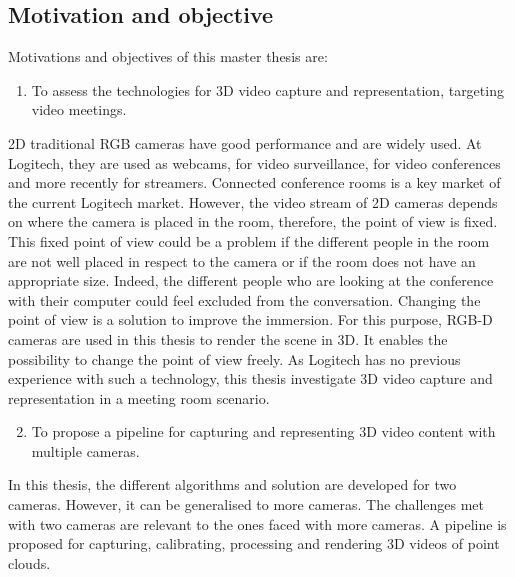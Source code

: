 \subsection{Motivation and objective}
\label{section:motivation_objective}

Motivations and objectives of this master thesis are:

\begin{enumerate}
  \setcounter{enumi}{0}
  \item To assess the technologies for 3D video capture and representation, targeting video meetings.
\end{enumerate}

2D traditional RGB cameras have good performance and are widely used. At Logitech, they are used as webcams, for video surveillance, for video conferences and more recently for streamers. Connected conference rooms is a key market of the current Logitech market. However, the video stream of 2D cameras depends on where the camera is placed in the room, therefore, the point of view is fixed. This fixed point of view could be a problem if the different people in the room are not well placed in respect to the camera or if the room does not have an appropriate size. Indeed, the different people who are looking at the conference with their computer could feel excluded from the conversation. Changing the point of view is a solution to improve the immersion. For this purpose, RGB-D cameras are used in this thesis to render the scene in 3D. It enables the possibility to change the point of view freely. As Logitech has no previous experience with such a technology, this thesis investigate 3D video capture and representation in a meeting room scenario.

\begin{enumerate}
  \setcounter{enumi}{1}
  \item To propose a pipeline for capturing and representing 3D video content with multiple cameras.
\end{enumerate}

In this thesis, the different algorithms and solution are developed for two cameras. However, it can be generalised to more cameras. The challenges met with two cameras are relevant to the ones faced with more cameras. A pipeline is proposed for capturing, calibrating, processing and rendering 3D videos of point clouds. 





